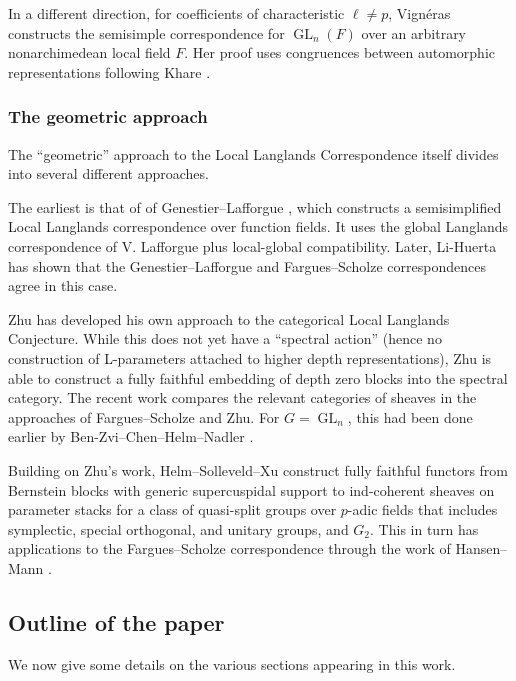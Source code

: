 \documentclass[reqno]{amsart}
\numberwithin{equation}{subsection}
\DeclareMathOperator{\GL}{GL}
\theoremstyle{remark}
\numberwithin{equation}{subsection}
\numberwithin{figure}{subsection}
\begin{document}
In a different direction, for coefficients of characteristic $\ell\ne p$, Vign\'{e}ras \cite{Vig01} constructs the semisimple correspondence for $\GL_n(F)$ over an arbitrary nonarchimedean local field $F$. Her proof uses congruences between automorphic representations following Khare \cite{Kha01}. 

\subsubsection{The geometric approach}

The ``geometric'' approach to the Local Langlands Correspondence itself divides into several different approaches.

The earliest is that of of Genestier--Lafforgue \cite{GL18}, which constructs a semisimplified Local Langlands correspondence over function fields. It uses the global Langlands correspondence of V. Lafforgue \cite{Laff18} plus local-global compatibility. Later, Li-Huerta \cite{LH23} has shown that the Genestier--Lafforgue and Fargues--Scholze correspondences agree in this case.


Zhu \cite{Zhu25} has developed his own approach to the categorical Local Langlands Conjecture. While this does not yet have a ``spectral action'' (hence no construction of L-parameters attached to higher depth representations), Zhu is able to construct a fully faithful embedding of depth zero blocks into the spectral category. The recent work \cite{GHILZ26} compares the relevant categories of sheaves in the approaches of Fargues--Scholze and Zhu. For $G = \GL_n$, this had been done earlier by Ben-Zvi--Chen--Helm--Nadler \cite{BCHN24}. 

Building on Zhu's work, Helm--Solleveld--Xu \cite[Theorem~1.2]{HSX26} construct fully faithful functors from Bernstein blocks with generic supercuspidal support to ind-coherent sheaves on parameter stacks for a class of quasi-split groups over $p$-adic fields that includes symplectic, special orthogonal, and unitary groups, and $G_2$. This in turn has applications to the Fargues--Scholze correspondence through the work of Hansen--Mann \cite{HM26}.



\subsection{Outline of the paper}

We now give some details on the various sections appearing in this work.
\end{document}
